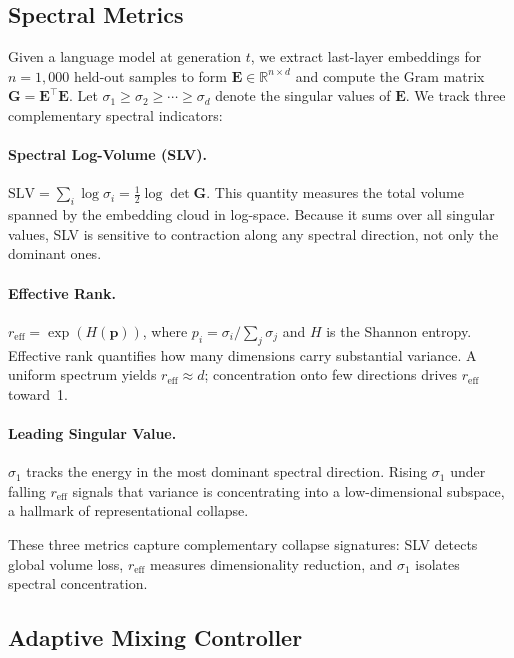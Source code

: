 \subsection{Spectral Metrics}
\label{subsec:spectral_metrics}

Given a language model at generation $t$, we extract last-layer embeddings for $n{=}1{,}000$ held-out samples to form $\mathbf{E} \in \mathbb{R}^{n \times d}$ and compute the Gram matrix $\mathbf{G} = \mathbf{E}^\top \mathbf{E}$.
Let $\sigma_1 \geq \sigma_2 \geq \cdots \geq \sigma_d$ denote the singular values of $\mathbf{E}$.
We track three complementary spectral indicators:

\paragraph{Spectral Log-Volume (SLV).}
$\text{SLV} = \sum_i \log \sigma_i = \frac{1}{2} \log \det \mathbf{G}$.
This quantity measures the total volume spanned by the embedding cloud in log-space.
Because it sums over all singular values, SLV is sensitive to contraction along any spectral direction, not only the dominant ones.

\paragraph{Effective Rank.}
$r_{\text{eff}} = \exp(H(\mathbf{p}))$, where $p_i = \sigma_i / \sum_j \sigma_j$ and $H$ is the Shannon entropy.
Effective rank quantifies how many dimensions carry substantial variance.
A uniform spectrum yields $r_{\text{eff}} \approx d$; concentration onto few directions drives $r_{\text{eff}}$ toward~1.

\paragraph{Leading Singular Value.}
$\sigma_1$ tracks the energy in the most dominant spectral direction.
Rising $\sigma_1$ under falling $r_{\text{eff}}$ signals that variance is concentrating into a low-dimensional subspace, a hallmark of representational collapse.

These three metrics capture complementary collapse signatures: SLV detects global volume loss, $r_{\text{eff}}$ measures dimensionality reduction, and $\sigma_1$ isolates spectral concentration.

\subsection{Adaptive Mixing Controller}
\label{subsec:controller}

